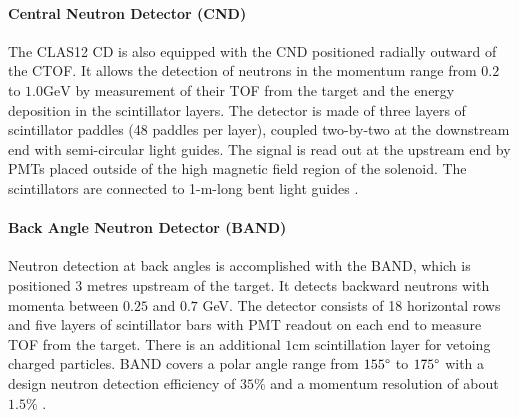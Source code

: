 \paragraph{Central Neutron Detector (CND)}
    The CLAS12 CD is also equipped with the CND positioned radially outward of the CTOF.
    It allows the detection of neutrons in the momentum range from $0.2$ to $1.0 \text{GeV}$ by measurement of their TOF from the target and the energy deposition in the scintillator layers.
    The detector is made of three layers of scintillator paddles (48 paddles per layer), coupled two-by-two at the downstream end with semi-circular light guides.
    The signal is read out at the upstream end by PMTs placed outside of the high magnetic field region of the solenoid.
    The scintillators are connected to 1-m-long bent light guides \cite{chatagnon2020}.

\paragraph{Back Angle Neutron Detector (BAND)}
    Neutron detection at back angles is accomplished with the BAND, which is positioned 3 metres upstream of the target.
    It detects backward neutrons with momenta between $0.25$ and $0.7$ GeV.
    The detector consists of 18 horizontal rows and five layers of scintillator bars with PMT readout on each end to measure TOF from the target.
    There is an additional $1 \text{cm}$ scintillation layer for vetoing charged particles.
    BAND covers a polar angle range from $155\degree$ to $175\degree$ with a design neutron detection efficiency of $35\%$ and a momentum resolution of about $1.5\%$ \cite{segarra2020}.
